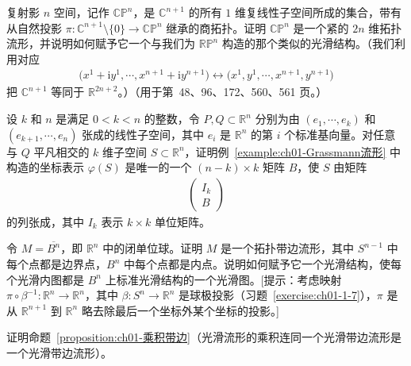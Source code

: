 \documentclass[../../main.tex]{subfiles}
\begin{document}
\begin{exercise}\label{exercise:ch01-1-9}
复射影 $n$ 空间，记作 $\mathbb{CP}^{n}$，是 $\mathbb{C}^{n+1}$ 的所有 $1$ 维复线性子空间所成的集合，带有从自然投影 $\pi:\mathbb{C}^{n+1}\setminus\{0\}\to\mathbb{CP}^{n}$ 继承的商拓扑。证明 $\mathbb{CP}^{n}$ 是一个紧的 $2n$ 维拓扑流形，并说明如何赋予它一个与我们为 $\mathbb{RP}^{n}$ 构造的那个类似的光滑结构。（我们利用对应
\begin{align*}
\bigl(x^{1}+\mathrm{i}y^{1},\cdots ,x^{n+1}+\mathrm{i}y^{n+1}\bigr)\leftrightarrow\bigl(x^{1},y^{1},\cdots ,x^{n+1},y^{n+1}\bigr)
\end{align*}
把 $\mathbb{C}^{n+1}$ 等同于 $\mathbb{R}^{2n+2}$。）（用于第~48、96、172、560、561 页。）
\end{exercise}

\begin{exercise}\label{exercise:ch01-1-10}
设 $k$ 和 $n$ 是满足 $0<k<n$ 的整数，令 $P,Q\subset\mathbb{R}^{n}$ 分别为由 $(e_{1},\cdots ,e_{k})$ 和 $(e_{k+1},\cdots ,e_{n})$ 张成的线性子空间，其中 $e_{i}$ 是 $\mathbb{R}^{n}$ 的第 $i$ 个标准基向量。对任意与 $Q$ 平凡相交的 $k$ 维子空间 $S\subset\mathbb{R}^{n}$，证明例~\cref{example:ch01-Grassmann流形} 中构造的坐标表示 $\varphi(S)$ 是唯一的一个 $(n-k)\times k$ 矩阵 $B$，使 $S$ 由矩阵
\begin{align*}
\begin{pmatrix}I_{k}\\ B\end{pmatrix}
\end{align*}
的列张成，其中 $I_{k}$ 表示 $k\times k$ 单位矩阵。
\end{exercise}

\begin{exercise}\label{exercise:ch01-1-11}
令 $M=\overline{B^{n}}$，即 $\mathbb{R}^{n}$ 中的闭单位球。证明 $M$ 是一个拓扑带边流形，其中 $S^{n-1}$ 中每个点都是边界点，$B^{n}$ 中每个点都是内点。说明如何赋予它一个光滑结构，使每个光滑内图都是 $B^{n}$ 上标准光滑结构的一个光滑图。[提示：考虑映射 $\pi\circ\beta^{-1}:\mathbb{R}^{n}\to\mathbb{R}^{n}$，其中 $\beta:S^{n}\to\mathbb{R}^{n}$ 是球极投影（习题~\cref{exercise:ch01-1-7}），$\pi$ 是从 $\mathbb{R}^{n+1}$ 到 $\mathbb{R}^{n}$ 略去除最后一个坐标外某个坐标的投影。]
\end{exercise}

\begin{exercise}\label{exercise:ch01-1-12}
证明命题~\cref{proposition:ch01-乘积带边}（光滑流形的乘积连同一个光滑带边流形是一个光滑带边流形）。
\end{exercise}
\end{document}
